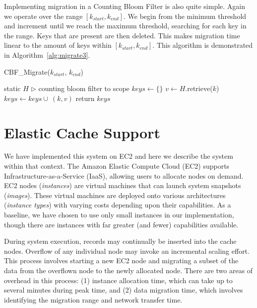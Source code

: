 Implementing migration in a Counting Bloom Filter is also quite simple. Again
we operate over the range $[k_{start},k_{end}]$. We begin from the minimum
threshold and increment until we reach the maximum threshold, searching for
each key in the range. Keys that are present are then deleted. This makes
migration time linear to the amount of keys within $[k_{start},k_{end}]$. This
algorithm is demonstrated in Algorithm~\ref{alg:migrate3}.

\begin{algorithm}[htp]
\small
\caption{\label{alg:migrate3}CBF\_Migrate($k_{start}$, $k_{end}$)} \begin{algorithmic}[1]
\STATE static $H$ $\triangleright$ counting bloom filter to scope
\STATE $keys \leftarrow \{\}$
    \STATE $v \leftarrow H$.retrieve($k$)
      \STATE $keys \leftarrow keys \cup~(k,v)$
    \ENDIF
  \ENDIF
\ENDFOR
\STATE return $keys$
\end{algorithmic}
\end{algorithm}

\section{Elastic Cache Support} %
\label{sec:elastic_cache_support}
We have implemented this system on EC2 and here we describe the system within
that context. The Amazon Elastic Compute Cloud (EC2) supports
Infrastructure-as-a-Service (IaaS), allowing users to allocate nodes on demand.
EC2 nodes (\emph{instances}) are virtual machines that can launch system
snapshots (\emph{images}). These virtual machines are deployed onto various
architectures (\emph{instance types}) with varying costs depending upon their
capabilities. As a baseline, we have chosen to use only small instances in our
implementation, though there are instances with far greater (and fewer)
capabilities available.

During system execution, records may continually be inserted into the cache
nodes. Overflow of any individual node may invoke an incremental scaling
effort. This process involves starting a new EC2 node and migrating a subset of
the data from the overflown node to the newly allocated node. There are two
areas of overhead in this process: (1) instance allocation time, which can take
up to several minutes during peak time, and (2) data migration time, which
involves identifying the migration range and network transfer time.

